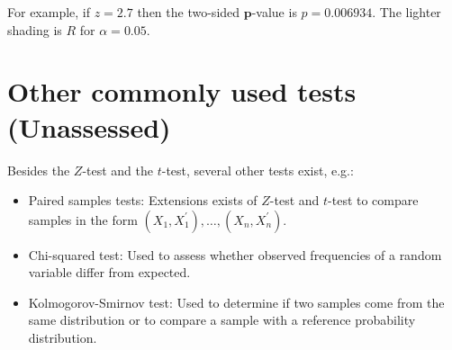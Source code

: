 \documentclass[10pt]{article}
\begin{document}
For example, if $z=2.7$ then the two-sided $\mathbf{p}$-value is $p=0.006934$. The lighter shading is $R$ for $\alpha=0.05$.

\section*{Other commonly used tests (Unassessed)}
Besides the $Z$-test and the $t$-test, several other tests exist, e.g.:

\begin{itemize}
  \item Paired samples tests: Extensions exists of $Z$-test and $t$-test to compare samples in the form $\left(X_{1}, X_{1}^{\prime}\right), \ldots,\left(X_{n}, X_{n}^{\prime}\right)$.
  \item Chi-squared test: Used to assess whether observed frequencies of a random variable differ from expected.
  \item Kolmogorov-Smirnov test: Used to determine if two samples come from the same distribution or to compare a sample with a reference probability distribution.
\end{itemize}
\end{document}

